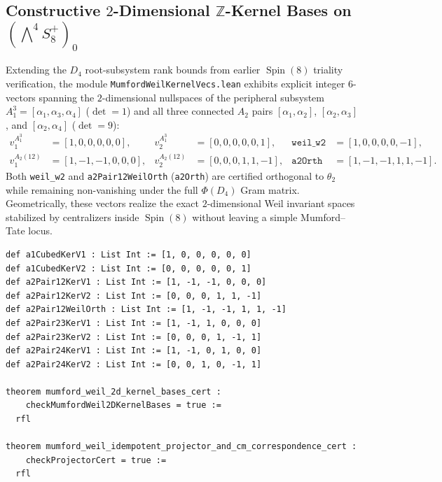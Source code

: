 \documentclass[11pt,a4paper]{article}
\begin{document}
\subsection{Constructive $2$-Dimensional $\mathbb{Z}$-Kernel Bases on $(\bigwedge^4 S^+_8)_0$}

Extending the $D_4$ root-subsystem rank bounds from earlier $\operatorname{Spin}(8)$ triality verification, the module \texttt{MumfordWeilKernelVecs.lean} exhibits explicit integer $6$-vectors spanning the $2$-dimensional nullspaces of the peripheral subsystem $A_1^3 = [\alpha_1, \alpha_3, \alpha_4]$ ($\det = 1$) and all three connected $A_2$ pairs $[\alpha_1,\alpha_2]$, $[\alpha_2,\alpha_3]$, and $[\alpha_2,\alpha_4]$ ($\det = 9$):
\begin{equation}
  \begin{aligned}
    v_1^{A_1^3} &= [1,0,0,0,0,0], & v_2^{A_1^3} &= [0,0,0,0,0,1], & \texttt{weil\_w2} &= [1,0,0,0,0,-1], \\
    v_1^{A_2(12)} &= [1,-1,-1,0,0,0], & v_2^{A_2(12)} &= [0,0,0,1,1,-1], & \texttt{a2Orth} &= [1,-1,-1,1,1,-1].
  \end{aligned}
\end{equation}
Both \texttt{weil\_w2} and \texttt{a2Pair12WeilOrth} (\texttt{a2Orth}) are certified orthogonal to $\theta_2$ while remaining non-vanishing under the full $\Phi(D_4)$ Gram matrix. Geometrically, these vectors realize the exact $2$-dimensional Weil invariant spaces stabilized by centralizers inside $\operatorname{Spin}(8)$ without leaving a simple Mumford--Tate locus.

\begin{lstlisting}[caption={Explicit $2$-dimensional $A_1^3$ and $A_2$ kernel bases in \texttt{MumfordWeilKernelVecs.lean}.}]
def a1CubedKerV1 : List Int := [1, 0, 0, 0, 0, 0]
def a1CubedKerV2 : List Int := [0, 0, 0, 0, 0, 1]
def a2Pair12KerV1 : List Int := [1, -1, -1, 0, 0, 0]
def a2Pair12KerV2 : List Int := [0, 0, 0, 1, 1, -1]
def a2Pair12WeilOrth : List Int := [1, -1, -1, 1, 1, -1]
def a2Pair23KerV1 : List Int := [1, -1, 1, 0, 0, 0]
def a2Pair23KerV2 : List Int := [0, 0, 0, 1, -1, 1]
def a2Pair24KerV1 : List Int := [1, -1, 0, 1, 0, 0]
def a2Pair24KerV2 : List Int := [0, 0, 1, 0, -1, 1]

theorem mumford_weil_2d_kernel_bases_cert :
    checkMumfordWeil2DKernelBases = true :=
  rfl

theorem mumford_weil_idempotent_projector_and_cm_correspondence_cert :
    checkProjectorCert = true :=
  rfl
\end{lstlisting}
\end{document}
